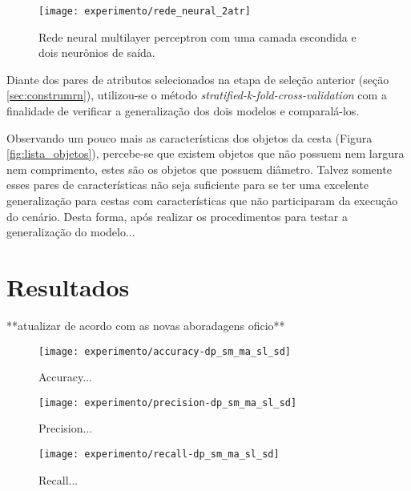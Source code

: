 \begin{figure}[!htb] \centering 
  \centering
  \texttt{[image: experimento/rede\_neural\_2atr]} 
  \caption{Rede neural multilayer perceptron com uma camada escondida e dois neurônios de saída. } 
  \label{fig:rede_neural_2atr}
\end{figure}

Diante dos pares de atributos selecionados na etapa de seleção anterior (seção \ref{sec:construmrn}), utilizou-se o método \textit{stratified-k-fold-cross-validation} com a finalidade de verificar a generalização dos dois modelos e comparalá-los.

Observando um pouco mais as características dos objetos da cesta (Figura \ref{fig:lista_objetos}), percebe-se que existem objetos que não possuem nem largura nem comprimento, estes são os objetos que possuem diâmetro. Talvez somente esses pares de características não seja suficiente para se ter uma excelente generalização para cestas com características que não participaram da execução do cenário. Desta forma, após realizar os procedimentos para testar a generalização do modelo... 

\section{Resultados} **atualizar de acordo com as novas aboradagens oficio**

\begin{figure}[!htb] \centering 
  \centering
  \texttt{[image: experimento/accuracy-dp\_sm\_ma\_sl\_sd]} 
  \caption{Accuracy... } 
  \label{fig:accuracy_result}
\end{figure}

\begin{figure}[!htb] \centering 
  \centering
  \texttt{[image: experimento/precision-dp\_sm\_ma\_sl\_sd]} 
  \caption{Precision... } 
  \label{fig:precision_result}
\end{figure}

\begin{figure}[!htb] \centering 
  \centering
  \texttt{[image: experimento/recall-dp\_sm\_ma\_sl\_sd]} 
  \caption{Recall... } 
  \label{fig:recall_result}
\end{figure}

 
